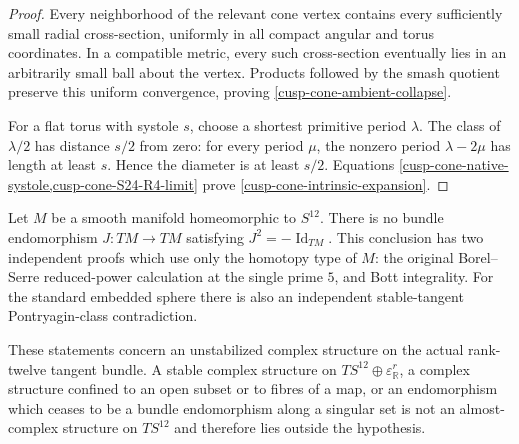 \begin{proof}
Every neighborhood of the relevant cone vertex contains every sufficiently
small radial cross-section, uniformly in all compact angular and torus
coordinates.  In a compatible metric, every such cross-section eventually
lies in an arbitrarily small ball about the vertex.  Products followed by
the smash quotient preserve this uniform convergence, proving
\cref{cusp-cone-ambient-collapse}.

For a flat torus with systole \(s\), choose a shortest primitive period
\(\lambda\).  The class of \(\lambda/2\) has distance \(s/2\) from zero:
for every period \(\mu\), the nonzero period \(\lambda-2\mu\) has length at
least \(s\).  Hence the diameter is at least \(s/2\).
Equations \cref{cusp-cone-native-systole,cusp-cone-S24-R4-limit} prove
\cref{cusp-cone-intrinsic-expansion}.
\end{proof}

\begin{proposition}
\label{cusp-cone-S12-almost-complex-obstruction}
Let \(M\) be a smooth manifold homeomorphic to \(S^{12}\).  There is no
bundle endomorphism \(J:TM\to TM\) satisfying \(J^2=-\operatorname{Id}_{TM}\).
This conclusion has two independent proofs which use only the homotopy type
of \(M\): the original Borel--Serre reduced-power calculation at the single
prime \(5\), and Bott integrality.  For the standard embedded sphere there is
also an independent stable-tangent Pontryagin-class contradiction.

These statements concern an unstabilized complex structure on the actual
rank-twelve tangent bundle.  A stable complex structure on
\(TS^{12}\oplus\varepsilon^r_{\mathbb R}\), a complex structure confined to
an open subset or to fibres of a map, or an endomorphism which ceases to be a
bundle endomorphism along a singular set is not an almost-complex structure
on \(TS^{12}\) and therefore lies outside the hypothesis.
\end{proposition}

